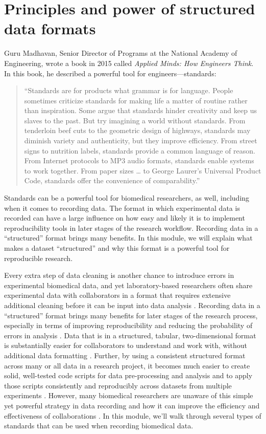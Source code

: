 \documentclass[]{tufte-book}
\begin{document}
\section{Principles and power of structured data formats}\label{module2}

Guru Madhavan, Senior Director of Programs at the National Academy of
Engineering, wrote a book in 2015 called \emph{Applied Minds: How Engineers Think}.
In this book, he described a powerful tool for engineers---standards:

\begin{quote}
``Standards are for products what grammar is for language. People sometimes
criticize standards for making life a matter of routine rather than inspiration.
Some argue that standards hinder creativity and keep us slaves to the past.
But try imagining a world without standards. From tenderloin beef cuts to
the geometric design of highways, standards may diminish variety and
authenticity, but they improve efficiency. From street signs to nutrition
labels, standards provide a common language of reason. From Internet
protocols to MP3 audio formats, standards enable systems to work together.
From paper sizes \ldots{} to George Laurer's Universal Product Code, standards
offer the convenience of comparability.'' \citep{madhavan2015applied}
\end{quote}

Standards can be a powerful tool for biomedical researchers, as well, including
when it comes to recording data.
The format in which experimental data is recorded can have a large influence on
how easy and likely it is to implement reproducibility tools in later stages of
the research workflow. Recording data in a ``structured'' format brings many
benefits. In this module, we will explain what makes a dataset ``structured'' and
why this format is a powerful tool for reproducible research.

Every extra step of data cleaning is another chance to introduce errors in
experimental biomedical data, and yet laboratory-based researchers often share
experimental data with collaborators in a format that requires extensive
additional cleaning before it can be input into data analysis \citep{broman2018data}.
Recording data in a ``structured'' format brings many benefits for later stages of
the research process, especially in terms of improving reproducibility and
reducing the probability of errors in analysis \citep{ellis2018share}. Data that is
in a structured, tabular, two-dimensional format is substantially easier for
collaborators to understand and work with, without additional data formatting
\citep{broman2018data}. Further, by using a consistent structured format across many
or all data in a research project, it becomes much easier to create solid,
well-tested code scripts for data pre-processing and analysis and to apply those
scripts consistently and reproducibly across datasets from multiple experiments
\citep{broman2018data}. However, many biomedical researchers are unaware of this
simple yet powerful strategy in data recording and how it can improve the
efficiency and effectiveness of collaborations \citep{ellis2018share}. In this
module, we'll walk through several types of standards that can be used when
recording biomedical data.
\end{document}
